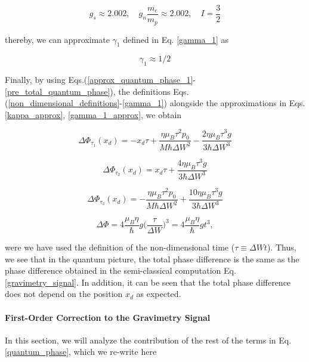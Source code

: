 \documentclass{article}
\begin{document}
\begin{equation}
g_{s} \approx 2.002 \mathrm{,}\quad g_{n} \frac{m_{e}}{m_{p}} \approx 2.002 \mathrm{,}\quad I = \frac{3}{2}
\end{equation}

thereby, we can approximate $\gamma_{1}$ defined in Eq. \ref{gamma_1} as

\begin{equation}\label{gamma_1_approx}
\gamma_{1} \approx 1/2
\end{equation}

Finally, by using Eqs.(\ref{approx_quantum_phase_1}-\ref{pre_total_quantum_phase}), the definitions Eqs.(\ref{non_dimensional_definitions}-\ref{gamma_1}) alongside the approximations in Eqs. \ref{kappa_approx}, \ref{gamma_1_approx}, we obtain

\begin{equation}
\Delta \Phi_{\tau_{1}}(x_{d}) = -x_{d}\tau + \frac{\eta \mu_{B} \tau^{2} p_{0}}{M \hbar \Delta W^{2}} - \frac{2 \eta \mu_{B} \tau^{3} g}{3 \hbar \Delta W^{3}}
\end{equation}

\begin{equation}
\Delta \Phi_{\tau_{2}}(x_{d}) = x_{d}\tau + \frac{4 \eta \mu_{B} \tau^{3} g}{3 \hbar \Delta W^{3}}
\end{equation}

\begin{equation}
\Delta \Phi_{\tau_{3}}(x_{d}) = -\frac{\eta \mu_{B} \tau^{2} p_{0}}{M \hbar \Delta W^{2}} + \frac{10 \eta \mu_{B} \tau^{3} g}{3 \hbar \Delta W^{3}}
\end{equation}

\begin{equation}\label{quantum_gravimetry_signal}
\Delta \Phi = 4 \frac{\mu_{B} \eta }{\hbar} g \bigg(\frac{\tau}{\Delta W}\bigg)^{3} = 4 \frac{\mu_{B} \eta }{\hbar} g t^{3},
\end{equation}

were we have used the definition of the non-dimensional time ($\tau\equiv \Delta W t$). Thus, we see that in the quantum picture, the total phase difference is the same as the phase difference obtained in the semi-classical computation Eq. \ref{gravimetry_signal}. In addition, it can be seen that the total phase difference does not depend on the position $x_{d}$ as expected.

\paragraph{First-Order Correction to the Gravimetry Signal}
In this section, we will analyze the contribution of the rest of the terms in Eq. \ref{quantum_phase}, which we re-write here
\end{document}

